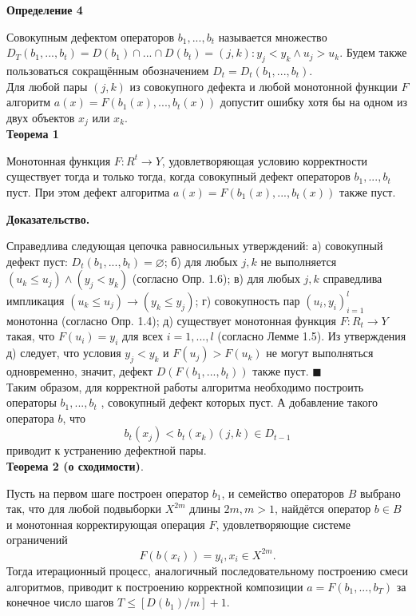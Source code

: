 \textbf{Определение 4} 

Совокупным дефектом операторов $b_1, . . . , b_t$ называется множество
$D_T (b_1, . . . , b_t) = D(b_1) \cap ... \cap D(b_t) = {(j, k): y_j < y_k \wedge u_j > u_k}.$
Будем также пользоваться сокращённым обозначением $D_t = D_t(b_1, . . . , b_t).$
\\
Для любой пары $(j, k)$ из совокупного дефекта и любой монотонной функции $F$ алгоритм $a(x) = F(b_1(x), . . . , b_t(x)) $ допустит ошибку хотя бы на одном из двух объектов $x_j$ или $x_k$.\\

\textbf{
Теорема 1} 

 Монотонная функция $F : R^t \rightarrow Y $, удовлетворяющая условию корректности существует тогда и только тогда, когда совокупный дефект операторов $b_1, . . . , b_t$ пуст. При этом дефект алгоритма $a(x) = F(b_1(x), . . . , b_t(x)) $ также пуст.


\textbf{Доказательство.}

Справедлива следующая цепочка равносильных утверждений:
а) совокупный дефект пуст: $D_t(b_1, . . . , b_t) = \varnothing$;
б) для любых $j, k$ не выполняется $(u_k \leq u_j ) \wedge (y_j < y_k)$ (согласно Опр. 1.6);
в) для любых $j, k$ справедлива импликация $(u_k \leq u_j ) \rightarrow (y_k \leq y_j )$;
г) совокупность пар $(u_i, y_i)^l_{i=1}$ монотонна (согласно Опр. 1.4);
д) существует монотонная функция $F : R_t \rightarrow Y$ такая, что $F(u_i) = y_i$ для всех
$i = 1, . . . , l$ (согласно Лемме 1.5).
Из утверждения д) следует, что условия $y_j < y_k$ и $F(u_j ) > F(u_k)$ не могут
выполняться одновременно, значит, дефект $D(F(b_1, . . . , b_t))$ также пуст. $\blacksquare$\\


Таким образом, для корректной работы алгоритма необходимо построить операторы $ b_1, . . . , b_t$
, совокупный дефект которых пуст. А добавление такого оператора $b$, что 
\begin{equation}\label{iter}
b_t (x_j) < b_t(x_k) (j, k) \in D_{t-1}
\end{equation}
приводит к устранению дефектной пары.\\

\textbf{Теорема 2 (о сходимости)}. 

Пусть на первом шаге построен оператор $b_1$, и семейство операторов $B$ выбрано так, что для любой подвыборки $X^{2m}$
длины $2m, m > 1$, найдётся оператор $b\in B$ и монотонная корректирующая операция $F$, удовлетворяющие системе ограничений
\[
F(b(x_i)) = y_i
, x_i \in X^{2m}.\]
Тогда итерационный процесс, аналогичный последовательному построению смеси алгоритмов, приводит к построению корректной композиции
$a = F(b_1, . . . , b_T )$ за конечное число шагов $T \leq [D(b_1)/m]+ 1$.


